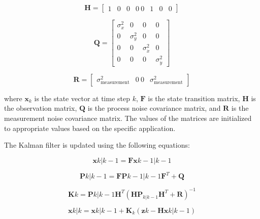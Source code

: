 \documentclass[journal]{IEEEtran} %
\begin{document}
\begin{equation}
\mathbf{H} = \begin{bmatrix} 1 & 0 & 0 & 0 \ 0 & 1 & 0 & 0 \end{bmatrix}
\end{equation}

\begin{equation}
\mathbf{Q} = \begin{bmatrix} \sigma_x^2 & 0 & 0 & 0 \\ 0 & \sigma_y^2 & 0 & 0 \\ 0 & 0 & \sigma_{\dot{x}}^2 & 0 \\ 0 & 0 & 0 & \sigma_{\dot{y}}^2 \end{bmatrix}
\end{equation}

\begin{equation}
\mathbf{R} = \begin{bmatrix} \sigma_{\text{measurement}}^2 & 0 \ 0 & \sigma_{\text{measurement}}^2 \end{bmatrix}
\end{equation}

where $\mathbf{x}_k$ is the state vector at time step $k$, $\mathbf{F}$ is the state transition matrix, $\mathbf{H}$ is the observation matrix, $\mathbf{Q}$ is the process noise covariance matrix, and $\mathbf{R}$ is the measurement noise covariance matrix. The values of the matrices are initialized to appropriate values based on the specific application.

The Kalman filter is updated using the following equations:

\begin{equation}
\mathbf{x}{k|k-1} = \mathbf{F}\mathbf{x}{k-1|k-1}
\end{equation}

\begin{equation}
\mathbf{P}{k|k-1} = \mathbf{F}\mathbf{P}{k-1|k-1}\mathbf{F}^T + \mathbf{Q}
\end{equation}

\begin{equation}
\mathbf{K}k = \mathbf{P}{k|k-1}\mathbf{H}^T(\mathbf{H}\mathbf{P}_{k|k-1}\mathbf{H}^T + \mathbf{R})^{-1}
\end{equation}


\begin{equation}
\mathbf{x}{k|k} = \mathbf{x}{k|k-1} + \mathbf{K}_k(\mathbf{z}k - \mathbf{H}\mathbf{x}{k|k-1})
\end{equation}
\end{document}
